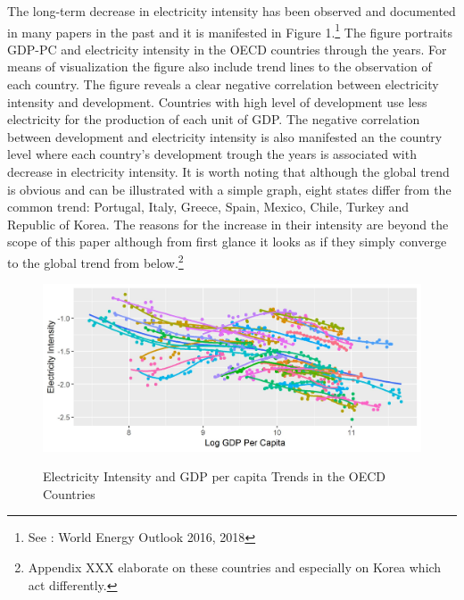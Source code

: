 \documentclass[]{amsart}
\begin{document}
The long-term decrease in electricity intensity has been observed and documented in many papers in the past and it is manifested in Figure 1.\footnote{See : World Energy Outlook 2016, 2018} The figure portraits GDP-PC and electricity intensity in the OECD countries through the years. For means of visualization the figure also include trend lines to the observation of each country. The figure reveals a clear negative correlation between electricity intensity and development. Countries with high level of development use less electricity for the production of each unit of GDP. The negative correlation between development and electricity intensity is also manifested an the country level where each country's development trough the years is associated with decrease in electricity intensity. It is worth noting that although the global trend is obvious and can be illustrated with a simple graph, eight states differ from the common trend: Portugal, Italy, Greece, Spain, Mexico, Chile, Turkey and Republic of Korea. The reasons for the increase in their intensity are beyond the scope of this paper although from first glance it looks as if they simply converge to the global trend from below.\footnote{Appendix XXX elaborate on these countries and especially on Korea which act differently.}

\begin{figure}[h]
    \centering
\caption{Electricity Intensity and GDP per capita Trends in the OECD Countries}
    \includegraphics[width=1\textwidth]    {Electricity_Intensity_GDPPC}
    \label{Fig_intro}
\end{figure}

\bigskip
\end{document}
